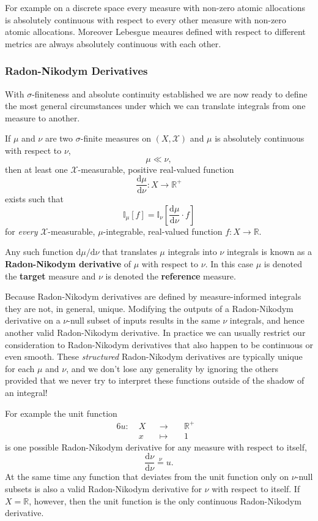 \documentclass[
  letterpaper,
  DIV=11,
  numbers=noendperiod]{scrartcl}
\begin{document}
For example on a discrete space every measure with non-zero atomic
allocations is absolutely continuous with respect to every other measure
with non-zero atomic allocations. Moreover Lebesgue meaures defined with
respect to different metrics are always absolutely continuous with each
other.

\hypertarget{radon-nikodym-derivatives}{%
\subsubsection{Radon-Nikodym
Derivatives}\label{radon-nikodym-derivatives}}

With \(\sigma\)-finiteness and absolute continuity established we are
now ready to define the most general circumstances under which we can
translate integrals from one measure to another.

If \(\mu\) and \(\nu\) are two \(\sigma\)-finite measures on
\((X, \mathcal{X})\) and \(\mu\) is absolutely continuous with respect
to \(\nu\), \[
\mu \ll \nu,
\] then at least one \(\mathcal{X}\)-measurable, positive real-valued
function \[
\frac{ \mathrm{d} \mu }{ \mathrm{d} \nu } : X \rightarrow \mathbb{R}^{+}
\] exists such that \[
\mathbb{I}_{\mu}[f] =
\mathbb{I}_{\nu} \left[
\frac{ \mathrm{d} \mu }{ \mathrm{d} \nu } \cdot f
\right]
\] for \emph{every} \(\mathcal{X}\)-measurable, \(\mu\)-integrable,
real-valued function \(f : X \rightarrow \mathbb{R}\).

Any such function \(\mathrm{d} \mu / \mathrm{d} \nu\) that translates
\(\mu\) integrals into \(\nu\) integrals is known as a
\textbf{Radon-Nikodym derivative} of \(\mu\) with respect to \(\nu\). In
this case \(\mu\) is denoted the \textbf{target} measure and \(\nu\) is
denoted the \textbf{reference} measure.

Because Radon-Nikodym derivatives are defined by measure-informed
integrals they are not, in general, unique. Modifying the outputs of a
Radon-Nikodym derivative on a \(\nu\)-null subset of inputs results in
the same \(\nu\) integrals, and hence another valid Radon-Nikodym
derivative. In practice we can usually restrict our consideration to
Radon-Nikodym derivatives that also happen to be continuous or even
smooth. These \emph{structured} Radon-Nikodym derivatives are typically
unique for each \(\mu\) and \(\nu\), and we don't lose any generality by
ignoring the others provided that we never try to interpret these
functions outside of the shadow of an integral!

For example the unit function \begin{alignat*}{6}
u :\; & X & &\rightarrow& \; & \mathbb{R}^{+} &
\\
& x & &\mapsto& & 1 &
\end{alignat*} is one possible Radon-Nikodym derivative for any measure
with respect to itself, \[
\frac{ \mathrm{d} \nu }{ \mathrm{d} \nu }
\overset{\nu}{=}
u.
\] At the same time any function that deviates from the unit function
only on \(\nu\)-null subsets is also a valid Radon-Nikodym derivative
for \(\nu\) with respect to itself. If \(X = \mathbb{R}\), however, then
the unit function is the only continuous Radon-Nikodym derivative.
\end{document}

